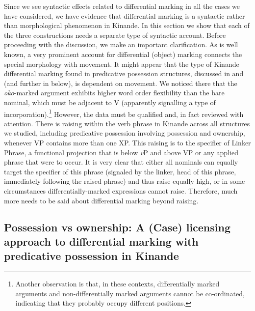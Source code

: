 \documentclass[output=paper]{langscibook}
\begin{document}
Since we see syntactic effects related to differential marking in all the cases we have considered, we have evidence that differential marking is a syntactic rather than morphological phenomenon in Kinande. In this section we show that each of the three constructions needs a separate type of syntactic account. Before proceeding with the discussion, we make an important clarification. As is well known, a very prominent account for differential (object) marking connects the special morphology with movement. It might appear that the type of Kinande differential marking found in predicative possession structures, discussed in  and (and further in  below), is dependent on movement. We noticed there that the \textit{oko}-marked argument exhibits higher word order flexibility than the bare nominal, which must be adjacent to V (apparently signalling a type of incorporation).\footnote{Another observation is that, in these contexts, differentially marked arguments and non-differentially marked arguments cannot be co-ordinated, indicating that they probably occupy different positions.} However, the data must be qualified and, in fact reviewed with attention. There is raising within the verb phrase in Kinande across all structures we studied, including predicative possession involving possession and ownership, whenever VP contains more than one XP. This raising is to the specifier of Linker Phrase, a functional projection that is below \textit{v}P and above VP or any applied phrase that were to occur. It is very clear that either all nominals can equally target the specifier of this phrase (signaled by the linker, head of this phrase, immediately following the raised phrase) and thus raise equally high, or in some circumstances differentially-marked expressions cannot raise. Therefore, much more needs to be said about differential marking beyond raising.

\subsection{Possession vs ownership: A (Case) licensing approach to differential marking with predicative possession in Kinande}\label{sec:schneider:subsection5.1Possessionsyntax}\label{subsec:schneider:subsection5.1LicensingAccount}
\end{document}
